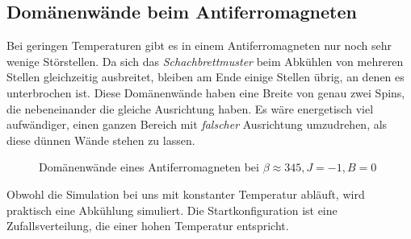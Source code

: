 \subsection{Domänenwände beim Antiferromagneten}
Bei geringen Temperaturen gibt es in einem Antiferromagneten nur noch sehr wenige Störstellen.
Da sich das \textit{Schachbrettmuster} beim Abkühlen von mehreren Stellen gleichzeitig ausbreitet, bleiben am Ende einige Stellen übrig, an denen es unterbrochen ist. Diese Domänenwände haben eine Breite von genau zwei Spins, die nebeneinander die gleiche Ausrichtung haben.
Es wäre energetisch viel aufwändiger, einen ganzen Bereich mit \textit{falscher} Ausrichtung umzudrehen, als diese dünnen Wände stehen zu lassen.
\begin{figure}[h]
  \hfill
  \caption{Domänenwände eines Antiferromagneten bei $\beta\approx 345, J=-1, B=0$\label{domainwall}}
\end{figure}

Obwohl die Simulation bei uns mit konstanter Temperatur abläuft, wird praktisch eine Abkühlung simuliert.
Die Startkonfiguration ist eine Zufallsverteilung, die einer hohen Temperatur entspricht.

